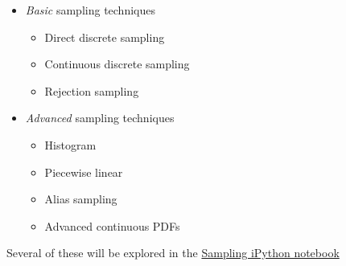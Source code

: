 \documentclass[12pt]{article}
\begin{document}
\begin{itemize}
  \item \textit{Basic} sampling techniques
  \begin{itemize}
    \item Direct discrete sampling
    \item Continuous discrete sampling
    \item Rejection sampling
  \end{itemize}
  
  \item \textit{Advanced }sampling techniques
  \begin{itemize}
    \item Histogram
    \item Piecewise linear
    \item Alias sampling
    \item Advanced continuous PDFs
  \end{itemize}
\end{itemize}

Several of these will be explored in the \href{08-03_Sampling.ipynb}{Sampling iPython notebook}
\end{document}
